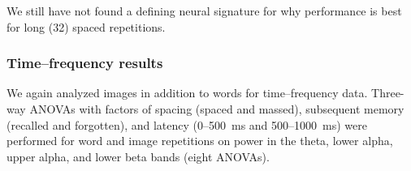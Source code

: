
We still have not found a defining neural signature for why performance is best for long (32) spaced repetitions.

\subsubsection{Time--frequency results}

We again analyzed images in addition to words for time--frequency data.
Three-way ANOVAs with factors of spacing (spaced and massed), subsequent memory (recalled and forgotten), and latency (0--500~ms and 500--1000~ms) were performed for word and image repetitions on power in the theta, lower alpha, upper alpha, and lower beta bands (eight ANOVAs).


